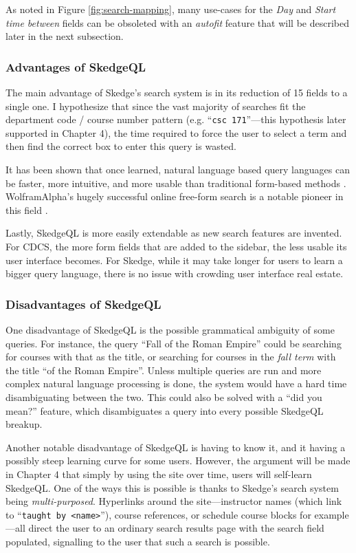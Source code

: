 \doublespacing

\noindent As noted in Figure \ref{fig:search-mapping}, many use-cases for the \emph{Day} and \emph{Start time between} fields can be obsoleted with an \emph{autofit} feature that will be described later in the next subsection.

  \subsubsection{Advantages of SkedgeQL}

    The main advantage of Skedge's search system is in its reduction of 15 fields to a single one. I hypothesize that since the vast majority of searches fit the department code / course number pattern (e.g. ``{\tt csc 171}''---this hypothesis later supported in Chapter 4), the time required to force the user to select a term and then find the correct box to enter this query is wasted.

    It has been shown that once learned, natural language based query languages can be faster, more intuitive, and more usable than traditional form-based methods \cite{dsl}. WolframAlpha's hugely successful online free-form search is a notable pioneer in this field \cite{wolfram}.

    Lastly, SkedgeQL is more easily extendable as new search features are invented. For CDCS, the more form fields that are added to the sidebar, the less usable its user interface becomes. For Skedge, while it may take longer for users to learn a bigger query language, there is no issue with crowding user interface real estate.
  
  \subsubsection{Disadvantages of SkedgeQL}

    One disadvantage of SkedgeQL is the possible grammatical ambiguity of some queries. For instance, the query ``Fall of the Roman Empire'' could be searching for courses with that as the title, or searching for courses in the \emph{fall term} with the title ``of the Roman Empire''. Unless multiple queries are run and more complex natural language processing is done, the system would have a hard time disambiguating between the two. This could also be solved with a ``did you mean?'' feature, which disambiguates a query into every possible SkedgeQL breakup.
    
    Another notable disadvantage of SkedgeQL is having to know it, and it having a possibly steep learning curve for some users. However, the argument will be made in Chapter 4 that simply by using the site over time, users will self-learn SkedgeQL. One of the ways this is possible is thanks to Skedge's search system being \emph{multi-purposed}. Hyperlinks around the site---instructor names (which link to ``{\tt taught by <name>}''), course references, or schedule course blocks for example---all direct the user to an ordinary search results page with the search field populated, signalling to the user that such a search is possible.


